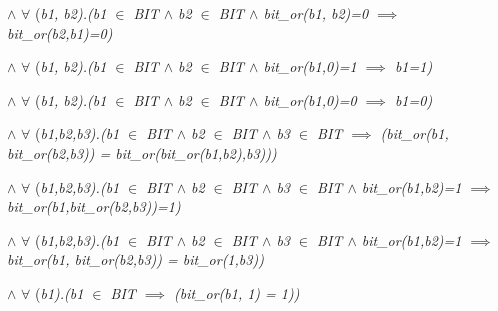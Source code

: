 \hspace*{0.20in} $\land$   $\forall$ \rm (\it b1\rm , \it b2\rm )\rm .\rm (\it b1  $\in$  \it BIT  $\land$  \it b2  $\in$  \it BIT  $\land$  \it bit\_or\rm (\it b1\rm , \it b2\rm )\rm =\rm 0  $\implies$  \it bit\_or\rm (\it b2\rm ,\it b1\rm )\rm =\rm 0\rm )

\hspace*{0.20in} $\land$   $\forall$ \rm (\it b1\rm , \it b2\rm )\rm .\rm (\it b1  $\in$  \it BIT  $\land$  \it b2  $\in$  \it BIT  $\land$  \it bit\_or\rm (\it b1\rm ,\rm 0\rm )\rm =\rm 1  $\implies$  \it b1\rm =\rm 1\rm )

\hspace*{0.20in} $\land$   $\forall$ \rm (\it b1\rm , \it b2\rm )\rm .\rm (\it b1  $\in$  \it BIT  $\land$  \it b2  $\in$  \it BIT  $\land$  \it bit\_or\rm (\it b1\rm ,\rm 0\rm )\rm =\rm 0  $\implies$  \it b1\rm =\rm 0\rm )

\hspace*{0.20in}

\hspace*{0.25in}

\hspace*{0.20in} $\land$   $\forall$ \rm (\it b1\rm ,\it b2\rm ,\it b3\rm )\rm .\rm (\it b1  $\in$  \it BIT  $\land$  \it b2  $\in$  \it BIT  $\land$  \it b3  $\in$  \it BIT  $\implies$  \rm (\it bit\_or\rm (\it b1\rm , \it bit\_or\rm (\it b2\rm ,\it b3\rm )\rm ) \rm = \it bit\_or\rm (\it bit\_or\rm (\it b1\rm ,\it b2\rm )\rm ,\it b3\rm )\rm )\rm )

\hspace*{0.20in} $\land$   $\forall$ \rm (\it b1\rm ,\it b2\rm ,\it b3\rm )\rm .\rm (\it b1  $\in$  \it BIT  $\land$  \it b2  $\in$  \it BIT  $\land$  \it b3  $\in$  \it BIT  $\land$  \it bit\_or\rm (\it b1\rm ,\it b2\rm )\rm =\rm 1  $\implies$  \it bit\_or\rm (\it b1\rm ,\it bit\_or\rm (\it b2\rm ,\it b3\rm )\rm )\rm =\rm 1\rm )

\hspace*{0.20in} $\land$   $\forall$ \rm (\it b1\rm ,\it b2\rm ,\it b3\rm )\rm .\rm (\it b1  $\in$  \it BIT  $\land$  \it b2  $\in$  \it BIT  $\land$  \it b3  $\in$  \it BIT  $\land$  \it bit\_or\rm (\it b1\rm ,\it b2\rm )\rm =\rm 1  $\implies$  \it bit\_or\rm (\it b1\rm , \it bit\_or\rm (\it b2\rm ,\it b3\rm )\rm ) \rm = \it bit\_or\rm (\rm 1\rm ,\it b3\rm )\rm )

\hspace*{0.20in} $\land$   $\forall$ \rm (\it b1\rm )\rm .\rm (\it b1  $\in$  \it BIT  $\implies$  \rm (\it bit\_or\rm (\it b1\rm , \rm 1\rm ) \rm = \rm 1\rm )\rm )

